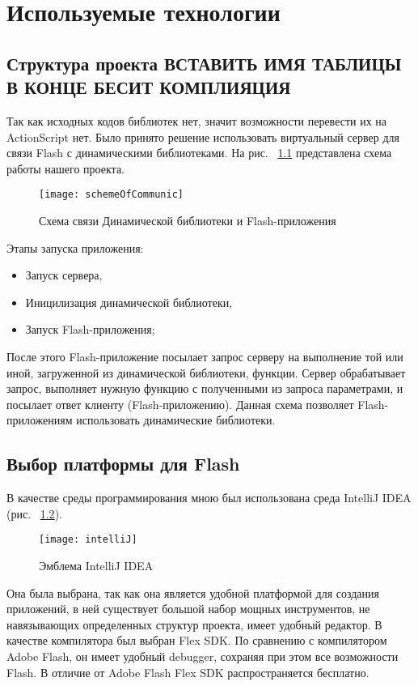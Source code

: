 \chapter{Используемые технологии}
\section{Структура проекта ВСТАВИТЬ ИМЯ ТАБЛИЦЫ В КОНЦЕ БЕСИТ КОМПЛИЯЦИЯ}
Так как исходных кодов библиотек нет, значит возможности перевести их на ActionScript нет. Было принято решение использовать виртуальный сервер для связи Flash с динамическими библиотеками. На рис. ~\ref{scheme1} представлена схема работы нашего проекта.\\
\begin{figure}[!ht]
	\begin{center}
		\texttt{[image: schemeOfCommunic]}
	\end{center}
	\caption{Схема связи Динамической библиотеки и Flash-приложения}
	\label{scheme1}
\end{figure}

Этапы запуска приложения:
 \begin{itemize}
        \item Запуск сервера,
        \item Иницилизация динамической библиотеки,
        \item Запуск Flash-приложения;
    \end{itemize}

После этого Flash-приложение посылает запрос серверу на выполнение той или иной, загруженной из динамической библиотеки, функции. Сервер обрабатывает запрос, выполняет нужную функцию с полученными из запроса параметрами, и посылает ответ клиенту (Flash-приложению). 
Данная схема позволяет Flash-приложениям использовать динамические библиотеки.

\section{Выбор платформы для Flash}
В качестве среды программирования мною был использована среда IntelliJ IDEA (рис. ~\ref{inteliJ}).
\begin{figure}[!ht]
	\begin{center}
		\texttt{[image: intelliJ]}
	\end{center}
	\caption{Эмблема IntelliJ IDEA}
	\label{inteliJ}
\end{figure}
Она была выбрана, так как она является удобной платформой для создания приложений, в ней существует большой набор мощных инструментов, не навязывающих определенных структур проекта, имеет удобный редактор. В качестве компилятора был выбран Flex SDK. По сравнению с компилятором Adobe Flash, он имеет удобный debugger, сохраняя при этом все возможности Flash. В отличие от Adobe Flash Flex SDK распространяется бесплатно.

